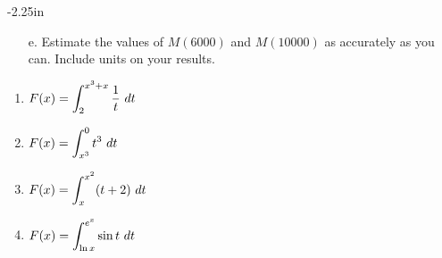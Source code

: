 \begin{adjustwidth*}{}{-2.25in}
\begin{multicols*}{2}
\begin{enumerate}[1)]
	\item[e.] Estimate the values of $M(6000)$ and $M(10000)$ as accurately as you can.  Include units on your results.
\ea
\end{enumerate}


\begin{enumerate}[1),resume]
\item $\ds F(x) = \int_2^{x^3+x} \frac{1}{t}\ dt$
\item $\ds F(x) = \int_{x^3}^{0} t^3\ dt$
\item $\ds F(x) = \int_{x}^{x^2} (t+2)\ dt$
\item $\ds F(x) = \int_{\ln x}^{e^x} \sin t\ dt$
\end{enumerate}

\end{multicols*}
\end{adjustwidth*}

